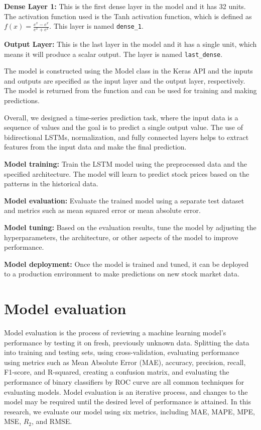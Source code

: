 \documentclass[a4paper]{article}
\begin{document}
\textbf{Dense Layer 1:} This is the first dense layer in the model and it has 32 units. The activation function used is the Tanh activation function, which is defined as $f(x) = \frac{e^{x}-e^{x}}{e^{x}+e^{x}}$. This layer is named \texttt{dense\_1}.

\textbf{Output Layer:} This is the last layer in the model and it has a single unit, which means it will produce a scalar output. The layer is named \texttt{last\_dense}.

The model is constructed using the Model class in the Keras API and the inputs and outputs are specified as the input layer and the output layer, respectively. The model is returned from the function and can be used for training and making predictions.

Overall, we designed a time-series prediction task, where the input data is a sequence of values and the goal is to predict a single output value. The use of bidirectional LSTMs, normalization, and fully connected layers helps to extract features from the input data and make the final prediction.

\textbf{Model training:} Train the LSTM model using the preprocessed data and the specified architecture. The model will learn to predict stock prices based on the patterns in the historical data.

\textbf{Model evaluation:} Evaluate the trained model using a separate test dataset and metrics such as mean squared error or mean absolute error.

\textbf{Model tuning:} Based on the evaluation results, tune the model by adjusting the hyperparameters, the architecture, or other aspects of the model to improve performance.

\textbf{Model deployment:} Once the model is trained and tuned, it can be deployed to a production environment to make predictions on new stock market data.
\section{Model evaluation}

Model evaluation is the process of reviewing a machine learning model's performance by testing it on fresh, previously unknown data. Splitting the data into training and testing sets, using cross-validation, evaluating performance using metrics such as Mean Absolute Error (MAE), accuracy, precision, recall, F1-score, and R-squared, creating a confusion matrix, and evaluating the performance of binary classifiers by ROC curve are all common techniques for evaluating models. Model evaluation is an iterative process, and changes to the model may be required until the desired level of performance is attained. In this research, we evaluate our model using six metrics, including MAE, MAPE, MPE, MSE, $R_2$, and RMSE.
\end{document}
